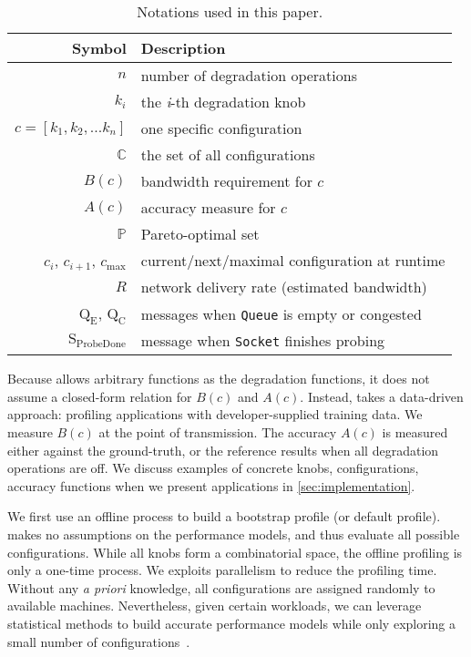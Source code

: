 \begin{table}
  \footnotesize
  \centering
  \begin{tabular}{r l}
    \toprule
    \textbf{Symbol} & \textbf{Description} \\
    \midrule
    $n$ & number of degradation operations \\
    $k_i$ & the \textit{i}-th degradation knob \\
    $c = [k_{1}, k_{2}, ... k_{n}]$ & one specific configuration \\
    $\mathbb{C}$ & the set of all configurations \\
    \midrule
    $B(c)$ & bandwidth requirement for $c$ \\
    $A(c)$ & accuracy measure for $c$ \\
    $\mathbb{P}$ & Pareto-optimal set \\
    \midrule
    $c_i$, $c_{i+1}$, $c_{\max}$ & current/next/maximal configuration at runtime \\
    $R$ & network delivery rate (estimated bandwidth) \\
    $\text{Q}_\text{E}$, $\text{Q}_\text{C}$ & messages when \texttt{Queue} is empty or congested \\
    $\text{S}_\text{ProbeDone}$ & message when \texttt{Socket} finishes probing \\
    \bottomrule
  \end{tabular}
  \caption{Notations used in this paper.}
  \label{tab:notations}
\end{table}

Because \sysname{} allows arbitrary functions as the degradation functions, it
does not assume a closed-form relation for $B(c)$ and $A(c)$. Instead,
\sysname{} takes a data-driven approach: profiling applications with
developer-supplied training data.  We measure $B(c)$ at the point of
transmission. The accuracy $A(c)$ is measured either against the ground-truth,
or the reference results when all degradation operations are off.  We discuss
examples of concrete knobs, configurations, accuracy functions when we present
applications in \autoref{sec:implementation}.

 We first use an offline process to build a bootstrap
profile (or default profile).
\sysname{} makes no assumptions on the performance models, and thus evaluate all possible configurations.
While all knobs form a combinatorial space, the offline profiling is only a one-time process.
We exploits parallelism to reduce the profiling time.
Without any \textit{a priori} knowledge, all
configurations are assigned randomly to available machines.
Nevertheless, given certain workloads, we can leverage statistical methods to build accurate performance
models while only exploring a small number of configurations~\cite{venkataraman2016ernest,
  alipourfard2017cherrypick}.

